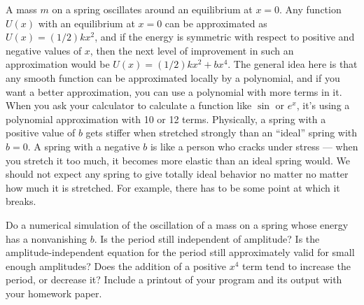 A mass $m$ on a spring oscillates around an equilibrium at $x=0$. Any function $U(x)$
        with an equilibrium at $x=0$ can be approximated as  $U(x)=(1/2)kx^2$,
        and if the energy
        is symmetric with respect to positive and negative values of $x$, then the next
        level of improvement in such an approximation would be $U(x)=(1/2)kx^2+bx^4$.
        The general idea here is that any smooth function
        can be approximated locally by a polynomial, and if you want a better approximation,
        you can use a polynomial with more terms in it. When you ask your calculator
        to calculate a function like $\sin$ or $e^x$, it's using a polynomial approximation
        with 10 or 12 terms. Physically,
        a spring with a positive value of $b$ gets stiffer when stretched strongly
        than an ``ideal'' spring with $b=0$. A spring with a negative $b$ is like a person
        who cracks under stress --- when you stretch it too much, it becomes more elastic
        than an ideal spring would. We should not expect any spring to give totally ideal
        behavior no matter no matter how much it is stretched. For example, there has to be
        some point at which it breaks.

        Do a numerical simulation of the oscillation of a mass on a spring whose
         energy has a nonvanishing $b$. Is the
        period still independent of amplitude? Is the amplitude-independent equation
        for the period still approximately valid for small enough amplitudes? Does the
        addition of a positive $x^4$ term tend to increase the period, or decrease it?
        Include a printout of your program and its output with your homework paper.
